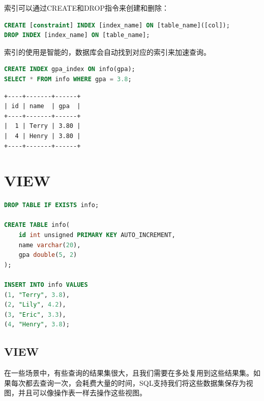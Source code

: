 \documentclass[12pt, openany, oneside]{book}
\begin{document}
索引可以通过CREATE和DROP指令来创建和删除：

\vspace{-0.5cm}

\begin{lstlisting}[language=SQL]
CREATE [constraint] INDEX [index_name] ON [table_name]([col]);
DROP INDEX [index_name] ON [table_name];
\end{lstlisting}

索引的使用是智能的，数据库会自动找到对应的索引来加速查询。\\


\begin{lstlisting}[language=SQL]
CREATE INDEX gpa_index ON info(gpa);
SELECT * FROM info WHERE gpa = 3.8;
\end{lstlisting}

\begin{tcolorbox}
	\begin{verbatim}
+----+-------+------+
| id | name  | gpa  |
+----+-------+------+
|  1 | Terry | 3.80 |
|  4 | Henry | 3.80 |
+----+-------+------+
	\end{verbatim}
\end{tcolorbox}

\newpage

\chapter{VIEW}

\vspace{0.5cm}


\begin{lstlisting}[language=SQL]
DROP TABLE IF EXISTS info;

CREATE TABLE info(
    id int unsigned PRIMARY KEY AUTO_INCREMENT,
    name varchar(20),
    gpa double(5, 2)
);

INSERT INTO info VALUES
(1, "Terry", 3.8),
(2, "Lily", 4.2),
(3, "Eric", 3.3),
(4, "Henry", 3.8);
\end{lstlisting}

\vspace{0.5cm}

\section{VIEW}

在一些场景中，有些查询的结果集很大，且我们需要在多处复用到这些结果集。如果每次都去查询一次，会耗费大量的时间，SQL支持我们将这些数据集保存为视图，并且可以像操作表一样去操作这些视图。\\
\end{document}
